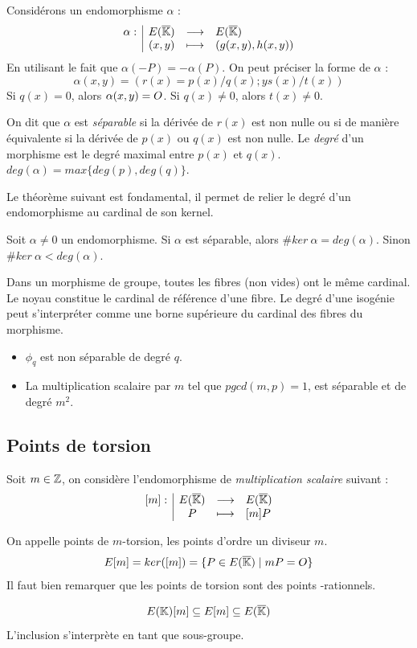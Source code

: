 Considérons un endomorphisme $\alpha$ :
$$\begin{array}{l|ccl} \alpha: & E(\overline{\mathbb{K}}{}) & \longrightarrow & E(\overline{\mathbb{K}}{}) \\ & (x, y) & \longmapsto & (g(x,y), h(x,y)) \end{array}$$
En utilisant le fait que $\alpha(-P) = -\alpha(P)$. On peut préciser la forme de $\alpha$ :
$$\alpha(x, y) = (r(x) = p(x)/q(x); y s(x)/t(x))$$
Si $q(x) = 0$, alors $\alpha(x, y) = O{}$. Si $q(x) \neq 0$, alors $t(x) \neq 0$.

\begin{definition}
On dit que $\alpha$ est \emph{séparable} si la dérivée de $r(x)$ est non nulle ou si de manière équivalente si la dérivée de $p(x)$ ou $q(x)$ est non nulle. Le \emph{degré} d'un morphisme est le degré maximal entre $p(x)$ et $q(x)$. $deg(\alpha) = max\{deg(p), deg(q)\}$.
\end{definition}

Le théorème suivant est fondamental, il permet de relier le degré d'un endomorphisme au cardinal de son kernel.
\begin{theoreme}
Soit $\alpha \neq 0$ un endomorphisme. Si $\alpha$ est séparable, alors $\# ker\ \alpha = deg(\alpha)$. Sinon $\# ker\ \alpha < deg(\alpha)$.
\end{theoreme}
Dans un morphisme de groupe, toutes les fibres (non vides) ont le même cardinal. Le noyau constitue le cardinal de référence d'une fibre. Le degré d'une isogénie peut s'interpréter comme une borne supérieure du cardinal des fibres du morphisme.

\begin{itemize}[label=--]
    \item $\phi_q$ est non séparable de degré $q$.
    \item La multiplication scalaire par $m$ tel que $pgcd(m, p) = 1$, est séparable et de degré $m^2$.
\end{itemize}

\subsection{Points de torsion}
Soit $m \in \mathbb{Z}$, on considère l'endomorphisme de \emph{multiplication scalaire} suivant : 
$$\begin{array}{l|ccl} [m]: & E(\overline{\mathbb{K}}{}) & \longrightarrow & E(\overline{\mathbb{K}}{}) \\ & P & \longmapsto & [m]P \end{array}$$

\begin{definition}
On appelle points de $m$-torsion, les points d'ordre un diviseur $m$.
\begin{equation}
E[m] = ker([m]) = \{ P \in E(\overline{\mathbb{K}}{}) \mid mP = O{}\}
\end{equation}
Il faut bien remarquer que les points de torsion sont des points \closure{}-rationnels.

\begin{equation*}
E(\mathbb{K}{})[m] \subseteq E[m] \subseteq E(\overline{\mathbb{K}}{})
\end{equation*}
L'inclusion s'interprète en tant que sous-groupe.
\end{definition}


